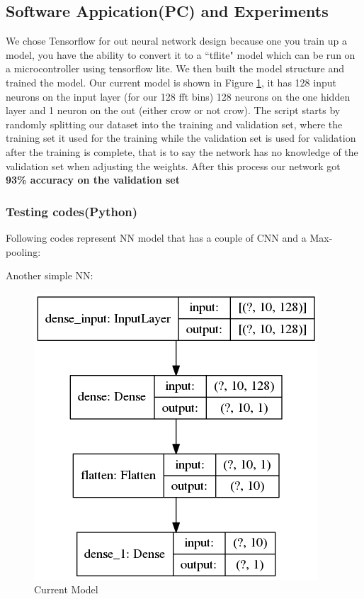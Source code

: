 \documentclass{article}
\begin{document}
\subsection{Software Appication(PC) and Experiments}
We chose Tensorflow for out neural network design because one you train up a model, you have the ability to convert it to a ``tflite" model which can be run on a microcontroller using tensorflow lite. We then built the model structure and trained the model. Our current model is shown in Figure \ref{model}, it has 128 input neurons on the input layer (for our 128 fft bins) 128 neurons on the one hidden layer and 1 neuron on the out (either crow or not crow). The script starts by randomly splitting our dataset into the training and validation set, where the training set it used for the training while the validation set is used for validation after the training is complete, that is to say the network has no knowledge of the validation set when adjusting the weights. After this process our network got \textbf{93\% accuracy on the validation set}

\subsubsection{Testing codes(Python)}
Following codes represent NN model that has a couple of CNN and a Max-pooling:

\hfill \break
Another simple NN:


\begin{figure}[H]
\centering
\includegraphics[scale=0.3]{../NN/audio/src/model.png}
\caption{Current Model}
\label{model}
\end{figure}
\newpage
\end{document}
